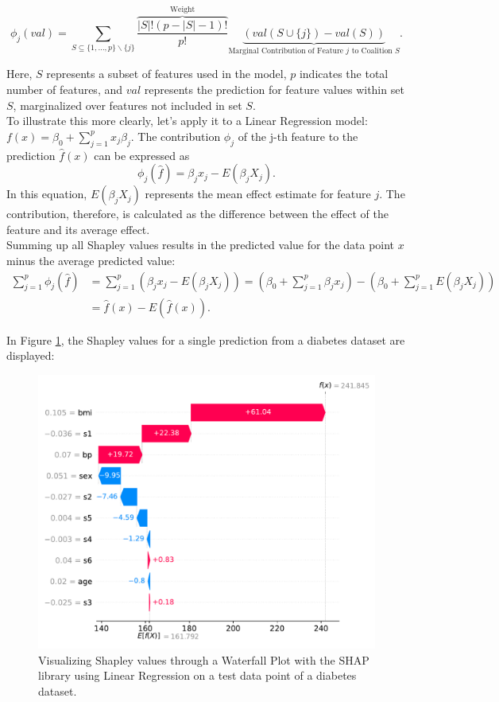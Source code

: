 \begin{equation}
    \phi_j(val)=\sum_{S\subseteq \{1,\dots ,p\}\backslash\{j\}} \overbrace{\dfrac{|S|!(p-|S|-1)!}{p!}}^{\text{Weight}} \underbrace{(val(S\cup \{j\})-val(S))}_{\text{Marginal Contribution of Feature } j \text{ to Coalition } S}.
\end{equation}

Here, $S$ represents a subset of features used in the model, $p$ indicates the total number of features, and $val$ represents the prediction for feature values within set $S$, marginalized over features not included in set $S$. \\
To illustrate this more clearly, let's apply it to a Linear Regression model: $f(x) = \beta_0 + \sum_{j=1}^p x_j\beta_j$. The contribution $\phi_j$ of the j-th feature to the prediction $\hat{f}(x)$ can be expressed as
\begin{equation}
    \phi_j(\hat{f}) = \beta_j x_j - E(\beta_j X_j).
\end{equation}
In this equation, $E(\beta_j X_j)$ represents the mean effect estimate for feature $j$. The contribution, therefore, is calculated as the difference between the effect of the feature and its average effect.\\
Summing up all Shapley values results in the predicted value for the data point $x$ minus the average predicted value:
\begin{equation}
\begin{split}
    \sum_{j=1}^p\phi_j(\hat{f})&=\sum_{j=1}^p(\beta_j x_j - E(\beta_j X_j)) = (\beta_0 + \sum_{j=1}^p\beta_j x_j) -(\beta_0 + \sum_{j=1}^p E(\beta_j X_j)) \\
    &= \hat{f}(x) - E(\hat{f}(x)).
\end{split}
\end{equation}

In Figure \ref{fig:shapley}, the Shapley values for a single prediction from a diabetes dataset are displayed:

\begin{figure}[H]
    \centering
    \includegraphics[width=0.8\linewidth]{pics/shap_waterfall.pdf}
    \caption[Visualizing Shapley values through a Waterfall Plot.]{Visualizing Shapley values through a Waterfall Plot with the SHAP library using Linear Regression on a test data point of a diabetes dataset.}
    \label{fig:shapley}
\end{figure}

